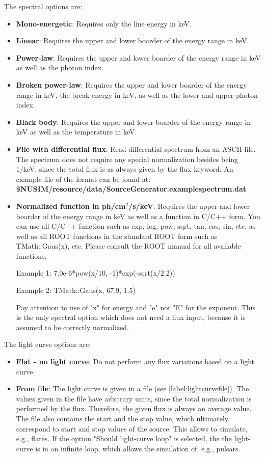The spectral options are:
\begin{itemize} 
\item \textbf{Mono-energetic}: Requires only the line energy in keV.
\item \textbf{Linear}: Requires the upper and lower boarder of the energy range in keV.
\item \textbf{Power-law}: Requires the upper and lower boarder of the energy range in keV as well as the photon index.
\item \textbf{Broken power-law}: Requires the upper and lower boarder of the energy range in keV, the break energy in keV, as well as the lower and upper photon index.
\item \textbf{Black body}: Requires the upper and lower boarder of the energy range in keV as well as the temperature in keV.
\item \textbf{File with differential flux}: Read differential spectrum from an ASCII file. The spectrum does not require any special normalization besides being 1/keV, since the total flux is as always given by the flux keyword. An example file of the format can be found at:\\
\textbf{\${NUSIM}/resource/data/SourceGenerator.examplespectrum.dat}
\item \textbf{Normalized function in ph/cm$^2$/s/keV}: Requires the upper and lower boarder of the energy range in keV as well as a function in C/C++ form.  You can use all C/C++ function such as exp, log, pow, sqrt, tan, cos, sin, etc. as well as all ROOT functions in the standard ROOT form such as TMath::Gaus(x), etc. Please consult the ROOT manual for all available functions.

Example 1: 7.0e-6*pow(x/10, -1)*exp(-sqrt(x/2.2))

Example 2: TMath::Gaus(x, 67.9, 1.5)

Pay attention to use of "x" for energy and "e" not "E" for the exponent. This is the only spectral option which does not need a flux input, because it is assumed to be correctly normalized.
\end{itemize}

The light curve options are:
\begin{itemize} 
\item \textbf{Flat - no light curve}: Do not perform any flux variations based on a light curve.
\item \textbf{From file}: The light curve is given in a file (see \ref{label:lightcurvefile}). 
The values given in the file have arbitrary units, since the total normalization is performed by the flux. 
Therefore, the given flux is always an average value. 
The file also contains the start and the stop value, which ultimately correspond to start and stop values of the source.
This allows to simulate, e.g., flares.
If the option "Should light-curve loop" is selected, the the light-curve is in an infinite loop, which allows the simulation of, e.g., pulsars. 
\end{itemize}


